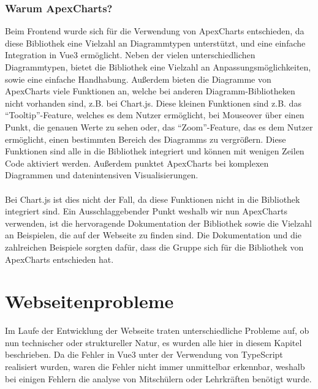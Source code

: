 \subsubsection{Warum ApexCharts?}
Beim Frontend wurde sich für die Verwendung von ApexCharts entschieden,
da diese Bibliothek eine Vielzahl an Diagrammtypen unterstützt,
und eine einfache Integration in Vue3 ermöglicht.
%
Neben der vielen unterschiedlichen Diagrammtypen,
bietet die Bibliothek eine Vielzahl an Anpassungsmöglichkeiten,
sowie eine einfache Handhabung.
%
Außerdem bieten die Diagramme von ApexCharts viele Funktionen an, 
welche bei anderen Diagramm-Bibliotheken nicht vorhanden sind, z.B. bei Chart.js.
Diese kleinen Funktionen sind z.B. das ``Tooltip''-Feature,
welches es dem Nutzer ermöglicht, bei Mouseover über einen Punkt, 
die genauen Werte zu sehen oder, das ``Zoom''-Feature, das es dem Nutzer ermöglicht,
einen bestimmten Bereich des Diagramms zu vergrößern.
%
Diese Funktionen sind alle in die Bibliothek integriert und können mit wenigen Zeilen Code aktiviert werden.
Außerdem punktet ApexCharts bei komplexen Diagrammen und datenintensiven Visualisierungen.
% 
\\\\
Bei Chart.js ist dies nicht der Fall,
da diese Funktionen nicht in die Bibliothek integriert sind.
%
Ein Ausschlaggebender Punkt weshalb wir nun ApexCharts verwenden, 
ist die hervoragende Dokumentation der Bibliothek \cite{ApexCharts} 
sowie die Vielzahl an Beispielen, die auf der Webseite zu finden sind.
%
Die Dokumentation und die zahlreichen Beispiele sorgten dafür, 
dass die Gruppe sich für die Bibliothek von ApexCharts entschieden hat.  

\section{Webseitenprobleme}
\label{subsec:problem_Webseite}
Im Laufe der Entwicklung der Webseite traten unterschiedliche Probleme auf,
ob nun technischer oder struktureller Natur, 
es wurden alle hier in diesem Kapitel beschrieben.
%
Da die Fehler in Vue3 unter der Verwendung von TypeScript realisiert wurden, 
waren die Fehler nicht immer unmittelbar erkennbar, 
weshalb bei einigen Fehlern die analyse von Mitschülern oder Lehrkräften benötigt wurde.

